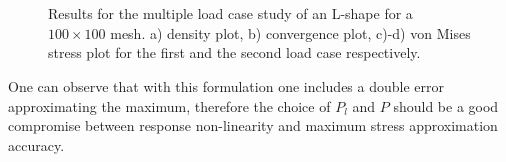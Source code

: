 \begin{figure}[ht]
\centering
{}%
\quad
{}%
  \\
  \quad
    \\
\caption{Results for the multiple load case study of an L-shape for a $100\times100$ mesh. a) density plot, b) convergence plot, c)-d) von Mises stress plot for the first and the second load case respectively. }%
\label{fig.2.22}%
\end{figure}
One can observe that with this formulation one includes a double error approximating the maximum, therefore the choice of $P_l$ and $P$ should be a good compromise between response non-linearity and maximum stress approximation accuracy.
